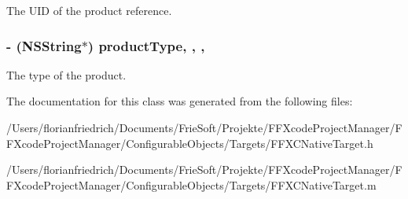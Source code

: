 The U\-I\-D of the product reference. \hypertarget{interface_f_f_x_c_native_target_a97378a0bfb4140fa4b9f40a8161ffac7}{
\subsubsection[{product\-Type}]{\setlength{\rightskip}{0pt plus 5cm}-\/ (N\-S\-String$\ast$) product\-Type\hspace{0.3cm}{\ttfamily [read]}, {\ttfamily [write]}, {\ttfamily [nonatomic]}, {\ttfamily [strong]}}}\label{interface_f_f_x_c_native_target_a97378a0bfb4140fa4b9f40a8161ffac7}
The type of the product. 

The documentation for this class was generated from the following files\-:\begin{DoxyCompactItemize}
\item 
/\-Users/florianfriedrich/\-Documents/\-Frie\-Soft/\-Projekte/\-F\-F\-Xcode\-Project\-Manager/\-F\-F\-Xcode\-Project\-Manager/\-Configurable\-Objects/\-Targets/F\-F\-X\-C\-Native\-Target.\-h\item 
/\-Users/florianfriedrich/\-Documents/\-Frie\-Soft/\-Projekte/\-F\-F\-Xcode\-Project\-Manager/\-F\-F\-Xcode\-Project\-Manager/\-Configurable\-Objects/\-Targets/F\-F\-X\-C\-Native\-Target.\-m\end{DoxyCompactItemize}
